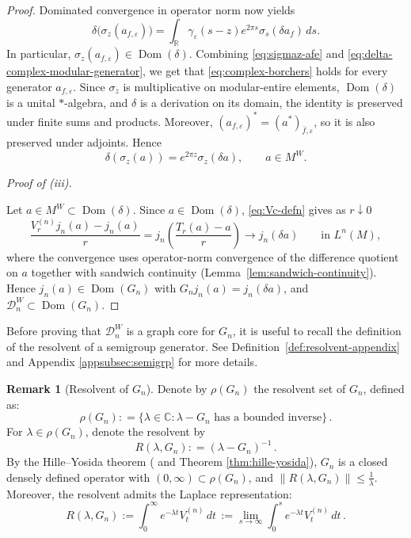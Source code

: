 \documentclass[11pt,a4paper]{article}
\theoremstyle{plain}
\numberwithin{theorem}{section}
\theoremstyle{definition}
\newtheorem{remark}[theorem]{Remark}
\newcommand{\?}{\overset{?}{=}}
\newcommand{\defeq}{\mathrel{\mathop:}=}
\newcommand{\I}{\infty}
\renewcommand{\l}{\lambda}	%
\renewcommand{\r}{\rho}		%
\newcommand{\cD}{\mathcal{D}}
\DeclareMathOperator{\Dom}{Dom}
\begin{document}
\begin{proof}
Dominated convergence in operator norm now yields
\begin{equation}\label{eq:delta-complex-modular-generator}
 \delta\bigl(\sigma_z(a_{f,\varepsilon})\bigr)
   =
   \int_{\mathbb R}
      \gamma_\varepsilon(s-z)e^{2\pi s}
      \sigma_s(\delta a_f)\,ds.
\end{equation}
In particular,
\(\sigma_z(a_{f,\varepsilon})\in\Dom(\delta)\).
Combining \eqref{eq:sigmaz-afe} and \eqref{eq:delta-complex-modular-generator}, we get that \eqref{eq:complex-borchers} holds for every generator
\(a_{f,\varepsilon}\). Since \(\sigma_z\) is multiplicative on
modular-entire elements, \(\Dom(\delta)\) is a unital
\(*\)-algebra, and \(\delta\) is a derivation on its domain, the
identity is preserved under finite sums and products. Moreover,
\((a_{f,\varepsilon})^*=(a^*)_{\bar f,\varepsilon}\), so it is also
preserved under adjoints. Hence
\[
 \delta(\sigma_z(a))=e^{2\pi z}\sigma_z(\delta a),
 \qquad a\in M^W.
\]

\emph{Proof of (iii).}

Let $a\in M^W\subset\Dom(\delta)$.  Since $a\in \Dom(\delta)$, \eqref{eq:Vc-defn} gives as $r\downarrow0$
\begin{equation*}
  \frac{V_r^{(n)}j_n(a)-j_n(a)}{r}
  =j_n\!\left(\frac{T_r(a)-a}{r}\right)
  \longrightarrow j_n(\delta a) \qquad\text{in }L^n(M),
\end{equation*}
where the convergence uses operator-norm convergence of the difference quotient on $a$ together with sandwich continuity (Lemma~\ref{lem:sandwich-continuity}).  Hence $j_n(a)\in\Dom(G_n)$ with $G_nj_n(a)=j_n(\delta a)$, and $\cD_n^{W}\subset\Dom(G_n)$.
\end{proof}

Before proving that $\mathcal D_n^W$ is a graph core for $G_n$, it is useful to recall the definition of the resolvent of a semigroup generator. See Definition~\ref{def:resolvent-appendix} and Appendix \ref{appsubsec:semigrp} for more details.
\begin{remark}[Resolvent of $G_n$]\label{rem:resolvent}
Denote by $\rho(G_n)$ the resolvent set of $G_n$, defined as:
\[
    \rho(G_n)\defeq \{\lambda\in \mathbb C: \lambda-G_n \text { has a bounded inverse}\}\,.
\]
For $\l\in\r(G_n)$, denote the resolvent by
\[
    R(\lambda,{G_n}) \defeq (\lambda-G_n)^{-1}\,.
\]
By the Hille–Yosida theorem (\cite{engel.nagel:00:one-parameter} and Theorem \ref{thm:hille-yosida}), $G_n$ is a closed densely defined operator with $(0,\I)\subset \rho(G_n)$, and $\|R(\lambda,{G_n})\|\leq \frac1\lambda$. Moreover, the resolvent admits the Laplace representation:
\[
    R(\lambda,{G_n}):=\int_0^\I e^{-\lambda t} V_t^{(n)} \,dt\,:=\lim_{s\to\I}\int_0^s e^{-\lambda t} V_t^{(n)}\, dt\,.
\]
\end{remark}
\end{document}
